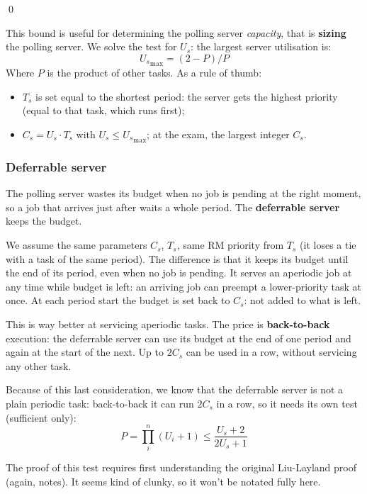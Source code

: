 \documentclass[a4paper,11pt]{article}
\begin{document}
\qed

\par\smallskip

This bound is useful for determining the polling server \textit{capacity}, that is \textbf{sizing} the polling server.
We solve the test for $U_s$: the largest server utilisation is:
$$
	{U_s}_\text{max} = (2 - P) / P
$$
Where $P$ is the product of other tasks.
As a rule of thumb:
\begin{itemize}
	\item $T_s$ is set equal to the shortest period: the server gets the highest priority (equal to that task, which runs first);
	\item $C_s = U_s \cdot T_s$ with $U_s \leq {U_s}_\text{max}$; at the exam, the largest integer $C_s$.
\end{itemize}

\subsubsection{Deferrable server}

The polling server wastes its budget when no job is pending at the right moment, so a job that arrives just after waits a whole period. The \textbf{deferrable server} keeps the budget.

We assume the same parameters $C_s$, $T_s$, same RM priority from $T_s$ (it loses a tie with a task of the same period).
The difference is that it keeps its budget until the end of its period, even when no job is pending.
It serves an aperiodic job at any time while budget is left: an arriving job can preempt a lower-priority task at once.
At each period start the budget is set back to $C_s$: not added to what is left.

This is way better at servicing aperiodic tasks.
The price is \textbf{back-to-back} execution: the deferrable server can use its budget at the end of one period and again at the start of the next.
Up to $2C_s$ can be used in a row, without servicing any other task.

\par\smallskip

Because of this last consideration, we know that the deferrable server is not a plain periodic task: back-to-back it can run $2C_s$ in a row, so it needs its own test (sufficient only):
$$
	P = \prod_i^n (U_i + 1) \leq \frac{U_s + 2}{2 U_s + 1}
$$

\par\smallskip

The proof of this test requires first understanding the original Liu-Layland proof (again, notes).
It seems kind of clunky, so it won't be notated fully here.
\end{document}
